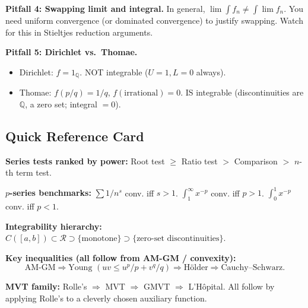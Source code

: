 \documentclass[11pt]{article}
\newcommand{\Q}{\mathbb{Q}}
\theoremstyle{myplain}
\theoremstyle{definition}
\theoremstyle{remark}
\begin{document}
\begin{watchout}
\textbf{Pitfall 4: Swapping limit and integral.}
In general, $\lim \int f_n \neq \int \lim f_n$. You need uniform convergence (or dominated convergence) to justify swapping. Watch for this in Stieltjes reduction arguments.
\end{watchout}

\begin{watchout}
\textbf{Pitfall 5: Dirichlet vs.\ Thomae.}
\begin{itemize}
  \item Dirichlet: $f = 1_\Q$. NOT integrable ($U = 1, L = 0$ always).
  \item Thomae: $f(p/q) = 1/q$, $f(\text{irrational}) = 0$. IS integrable (discontinuities are $\Q$, a zero set; integral $= 0$).
\end{itemize}
\end{watchout}

\subsection{Quick Reference Card}

\textbf{Series tests ranked by power:}
Root test $\geq$ Ratio test $>$ Comparison $>$ $n$-th term test.

\textbf{$p$-series benchmarks:}
$\sum 1/n^s$ conv. iff $s > 1$. \quad $\int_1^\infty x^{-p}$ conv. iff $p > 1$. \quad $\int_0^1 x^{-p}$ conv. iff $p < 1$.

\textbf{Integrability hierarchy:}
$C([a,b]) \subset \mathscr{R} \supset \{\text{monotone}\} \supset \{\text{zero-set discontinuities}\}$.

\textbf{Key inequalities (all follow from AM-GM / convexity):}
$$\text{AM-GM} \Rightarrow \text{Young } (uv \leq u^p/p + v^q/q) \Rightarrow \text{H\"older} \Rightarrow \text{Cauchy--Schwarz}.$$

\textbf{MVT family:}
Rolle's $\Rightarrow$ MVT $\Rightarrow$ GMVT $\Rightarrow$ L'H\^opital. All follow by applying Rolle's to a cleverly chosen auxiliary function.
\end{document}
